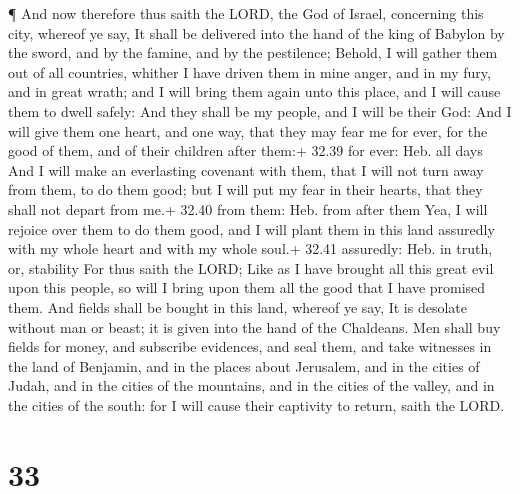  ¶ And now therefore thus saith the LORD, the God of
Israel, concerning this city, whereof ye say, It shall be delivered into
the hand of the king of Babylon by the sword, and by the famine, and by
the pestilence;  Behold, I will gather them out of all
countries, whither I have driven them in mine anger, and in my fury, and
in great wrath; and I will bring them again unto this place, and I will
cause them to dwell safely:  And they shall be my people,
and I will be their God:  And I will give them one heart,
and one way, that they may fear me for ever, for the good of them, and
of their children after them:+ 32.39 for ever: Heb. all days
 And I will make an everlasting covenant with them, that I
will not turn away from them, to do them good; but I will put my fear in
their hearts, that they shall not depart from me.+ 32.40 from them: Heb.
from after them  Yea, I will rejoice over them to do them
good, and I will plant them in this land assuredly with my whole heart
and with my whole soul.+ 32.41 assuredly: Heb. in truth, or, stability
 For thus saith the LORD; Like as I have brought all this
great evil upon this people, so will I bring upon them all the good that
I have promised them.  And fields shall be bought in this
land, whereof ye say, It is desolate without man or beast; it is given
into the hand of the Chaldeans.  Men shall buy fields for
money, and subscribe evidences, and seal them, and take witnesses in the
land of Benjamin, and in the places about Jerusalem, and in the cities
of Judah, and in the cities of the mountains, and in the cities of the
valley, and in the cities of the south: for I will cause their captivity
to return, saith the LORD.

\hypertarget{section-32}{%
\section{33}\label{section-32}}

